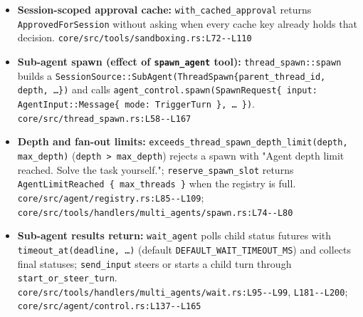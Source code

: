 \begin{itemize}
\item \textbf{Session-scoped approval cache:} \texttt{with\_\allowbreak{}cached\_\allowbreak{}approval} returns \texttt{ApprovedForSession} without asking when every cache key already holds that decision. \texttt{core/\allowbreak{}src/\allowbreak{}tools/\allowbreak{}sandboxing.\allowbreak{}rs:\allowbreak{}L72-\allowbreak{}-\allowbreak{}L110}
\item \textbf{Sub-agent spawn (effect of \texttt{spawn\_\allowbreak{}agent} tool):} \texttt{thread\_\allowbreak{}spawn:\allowbreak{}:\allowbreak{}spawn} builds a \texttt{SessionSource:\allowbreak{}:\allowbreak{}SubAgent(\allowbreak{}ThreadSpawn\{parent\_\allowbreak{}thread\_\allowbreak{}id, depth, \ldots{}\})} and calls \texttt{agent\_\allowbreak{}control.\allowbreak{}spawn(\allowbreak{}SpawnRequest\{ input:\allowbreak{} AgentInput:\allowbreak{}:\allowbreak{}Message\{ mode:\allowbreak{} TriggerTurn \}, \ldots{} \})}. \texttt{core/\allowbreak{}src/\allowbreak{}thread\_\allowbreak{}spawn.\allowbreak{}rs:\allowbreak{}L58-\allowbreak{}-\allowbreak{}L167}
\item \textbf{Depth and fan-out limits:} \texttt{exceeds\_\allowbreak{}thread\_\allowbreak{}spawn\_\allowbreak{}depth\_\allowbreak{}limit(\allowbreak{}depth, max\_\allowbreak{}depth)} (\texttt{depth > max\_\allowbreak{}depth}) rejects a spawn with "Agent depth limit reached. Solve the task yourself."; \texttt{reserve\_\allowbreak{}spawn\_\allowbreak{}slot} returns \texttt{AgentLimitReached \{ max\_\allowbreak{}threads \}} when the registry is full. \texttt{core/\allowbreak{}src/\allowbreak{}agent/\allowbreak{}registry.\allowbreak{}rs:\allowbreak{}L85-\allowbreak{}-\allowbreak{}L109}; \texttt{core/\allowbreak{}src/\allowbreak{}tools/\allowbreak{}handlers/\allowbreak{}multi\_\allowbreak{}agents/\allowbreak{}spawn.\allowbreak{}rs:\allowbreak{}L74-\allowbreak{}-\allowbreak{}L80}
\item \textbf{Sub-agent results return:} \texttt{wait\_\allowbreak{}agent} polls child status futures with \texttt{timeout\_\allowbreak{}at(\allowbreak{}deadline, \ldots{})} (default \texttt{DEFAULT\_\allowbreak{}WAIT\_\allowbreak{}TIMEOUT\_\allowbreak{}MS}) and collects final statuses; \texttt{send\_\allowbreak{}input} steers or starts a child turn through \texttt{start\_\allowbreak{}or\_\allowbreak{}steer\_\allowbreak{}turn}. \texttt{core/\allowbreak{}src/\allowbreak{}tools/\allowbreak{}handlers/\allowbreak{}multi\_\allowbreak{}agents/\allowbreak{}wait.\allowbreak{}rs:\allowbreak{}L95-\allowbreak{}-\allowbreak{}L99}, \texttt{L181-\allowbreak{}-\allowbreak{}L200}; \texttt{core/\allowbreak{}src/\allowbreak{}agent/\allowbreak{}control.\allowbreak{}rs:\allowbreak{}L137-\allowbreak{}-\allowbreak{}L165}

\end{itemize}
